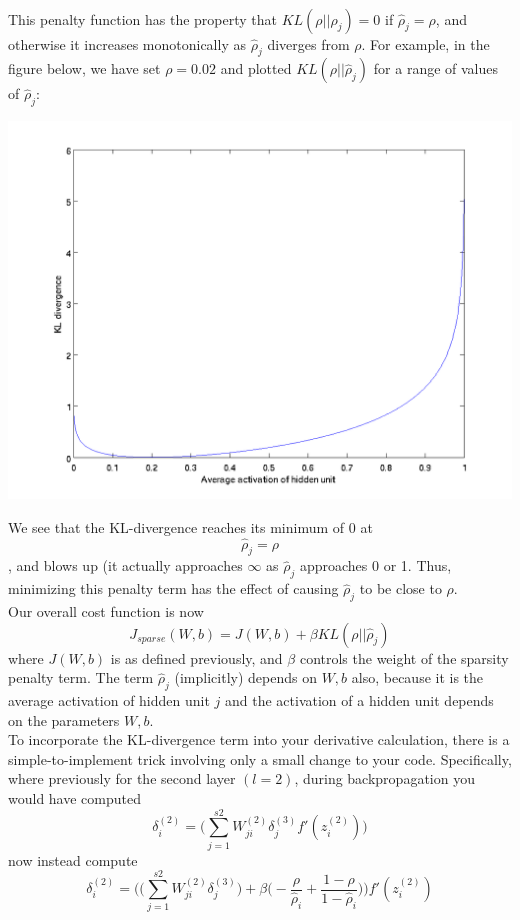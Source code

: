 \documentclass[conference]{IEEEtran}
\begin{document}
\paragraph{}
This penalty function has the property that $KL(\rho || \hat{\rho}_j) = 0$ if $\hat{\rho}_j = \rho$, and otherwise it 
increases monotonically as $\hat{\rho}_j$ diverges from $\rho$. For example, in the figure below, we have set $\rho = \bm{0.02}$ 
and plotted $KL(\rho || \hat{\rho}_j)$ for a range of values of $\hat{\rho}_j:$
\centerline{\includegraphics[scale=0.4]{KLPenaltyExample.png}}
We see that the KL-divergence reaches its minimum of 0 at
\begin{equation}
    \hat{\rho}_j = \rho
    \end{equation}
, and blows up (it actually approaches $\infty$ as $\hat{\rho}_j$ approaches 0 or 1. Thus, minimizing this 
penalty term has the effect of causing $\hat{\rho}_j$  to be close to $\rho$.\\
Our overall cost function is now 
\begin{equation}
    J_{sparse}(W,b) = J(W,b) + \beta KL(\rho || \hat{\rho}_j)
    \end{equation}
where $J(W,b)$  is as defined previously, and $\beta$  controls the weight of the sparsity penalty term. The term
$\hat{\rho}_j$ (implicitly) depends on $W,b$  also, because it is the average activation of hidden unit $j$
and the activation of a hidden unit depends on the parameters $W,b$.\\
To incorporate the KL-divergence term into your derivative calculation, there is a simple-to-implement trick involving only a small change to your code. 
Specifically, where previously for the second layer $(l = 2)$, during backpropagation you would have computed
\begin{equation}
    \delta_i^{(2)} = \biggl(\sum_{j=1}^{s2} W_{ji}^{(2)} \delta_j^{(3)} f'(z_i^{(2)}) \biggr)
    \end{equation}
now instead compute
\begin{equation}
    \delta_i^{(2)} = \biggl( \biggl(\sum_{j=1}^{s2} W_{ji}^{(2)} \delta_j^{(3)}\biggr) + \beta \biggl( -\frac{\rho}{\hat{\rho}_i} +  \frac{1-\rho}{1 - \hat{\rho}_i}\biggr) \biggr)f'(z_i^{(2)})
    \end{equation}
\end{document}
